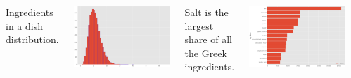 \documentclass{tikzposter} %
\begin{document}
\begin{columns}
{\begin{tikzfigure}
    \end{tikzfigure}
    
        \item Ingredients in a dish distribution.
        \begin{tikzfigure}%
            \includegraphics[width=0.6\linewidth]{figures/cu.eps}
        \end{tikzfigure}
        \item Salt is the largest share of all the Greek ingredients.
        \begin{tikzfigure}%
            \includegraphics[width=0.6\linewidth]{figures/15.eps}
        \end{tikzfigure}



}



\end{columns}
\end{document}
